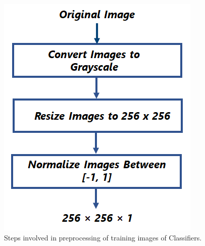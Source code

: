 \begin{figure}[H]
        \begin{center}
	    \includegraphics[scale=0.55]{images/Implementation/ClassifierPreprocessing.png}
	    \caption[Steps involved in preprocessing of training images of Classifiers.]{Steps involved in preprocessing of training images of Classifiers.}
	    \label{fig:PreprocessingClassfier}
	    \end{center}
\end{figure}

















































































